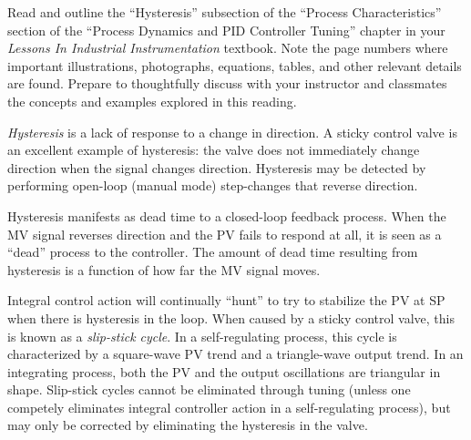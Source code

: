 

Read and outline the ``Hysteresis'' subsection of the ``Process Characteristics'' section of the ``Process Dynamics and PID Controller Tuning'' chapter in your {\it Lessons In Industrial Instrumentation} textbook.  Note the page numbers where important illustrations, photographs, equations, tables, and other relevant details are found.  Prepare to thoughtfully discuss with your instructor and classmates the concepts and examples explored in this reading.














{\it Hysteresis} is a lack of response to a change in direction.  A sticky control valve is an excellent example of hysteresis: the valve does not immediately change direction when the signal changes direction.  Hysteresis may be detected by performing open-loop (manual mode) step-changes that reverse direction.

\vskip 10pt

Hysteresis manifests as dead time to a closed-loop feedback process.  When the MV signal reverses direction and the PV fails to respond at all, it is seen as a ``dead'' process to the controller.  The amount of dead time resulting from hysteresis is a function of how far the MV signal moves.

\vskip 10pt

Integral control action will continually ``hunt'' to try to stabilize the PV at SP when there is hysteresis in the loop.  When caused by a sticky control valve, this is known as a {\it slip-stick cycle}.  In a self-regulating process, this cycle is characterized by a square-wave PV trend and a triangle-wave output trend.  In an integrating process, both the PV and the output oscillations are triangular in shape.  Slip-stick cycles cannot be eliminated through tuning (unless one competely eliminates integral controller action in a self-regulating process), but may only be corrected by eliminating the hysteresis in the valve.










